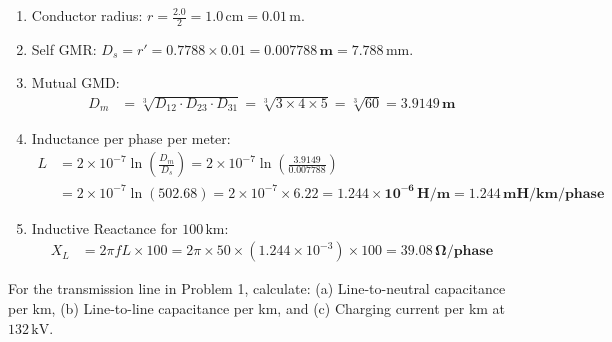 \documentclass[11pt,a4paper]{article}
\newenvironment{Problem}[1][Numerical Problem]{\begin{tcolorbox}[problembox, title=#1]}{\end{tcolorbox}}
\newenvironment{Solution}[1][Step-by-Step Solution]{\begin{tcolorbox}[solbox, title=#1]}{\end{tcolorbox}}
\begin{document}
\begin{Solution}
\begin{enumerate}
  \item Conductor radius: $r = \frac{2.0}{2} = 1.0\,\text{cm} = 0.01\,\text{m}$.
  \item Self GMR: $D_s = r' = 0.7788 \times 0.01 = \mathbf{0.007788\,\text{m}} = 7.788\,\text{mm}$.
  \item Mutual GMD:
    \begin{align*}
      D_m &= \sqrt[3]{D_{12} \cdot D_{23} \cdot D_{31}} = \sqrt[3]{3 \times 4 \times 5} = \sqrt[3]{60} = \mathbf{3.9149\,\text{m}}
    \end{align*}
  \item Inductance per phase per meter:
    \begin{align*}
      L &= 2 \times 10^{-7} \ln\left(\frac{D_m}{D_s}\right) = 2 \times 10^{-7} \ln\left(\frac{3.9149}{0.007788}\right) \\
        &= 2 \times 10^{-7} \ln(502.68) = 2 \times 10^{-7} \times 6.22 = \mathbf{1.244 \times 10^{-6}\,\text{H/m}} = \mathbf{1.244\,\text{mH/km/phase}}
    \end{align*}
  \item Inductive Reactance for $100\,\text{km}$:
    \begin{align*}
      X_L &= 2\pi f L \times 100 = 2\pi \times 50 \times (1.244 \times 10^{-3}) \times 100 = \mathbf{39.08\,\Omega/\text{phase}}
    \end{align*}
\end{enumerate}
\end{Solution}

\begin{Problem}[Problem 2: Capacitance of a 3-$\Phi$ Transposed Single Circuit Line]
For the transmission line in Problem 1, calculate: (a) Line-to-neutral capacitance per km, (b) Line-to-line capacitance per km, and (c) Charging current per km at $132\,\text{kV}$.
\end{Problem}
\end{document}
